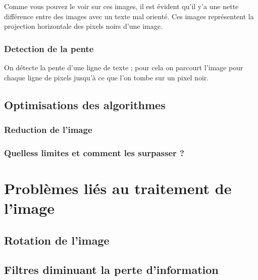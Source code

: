  Comme vous pouvez le voir sur ces images, il est \'evident qu'il y'a une
 nette diff\'erence entre des images avec un texte mal orient\'e. Ces
 images repr\'esentent la projection horizontale des pixels noirs d'une image.





\subsection{ Detection de la pente }
On d\'etecte la pente d'une ligne de texte ; pour cela on parcourt
l'image pour chaque ligne de pixels jusqu'\`a ce que l'on tombe sur un
pixel noir.

\section{ Optimisations des algorithmes }
\subsection{ Reduction de l'image }


\subsection{ Quelless limites et comment les surpasser ? }


\chapter{ Probl\`emes li\'es au traitement de l'image }
\section{ Rotation de l'image}
\section{ Filtres diminuant la perte d'information}






